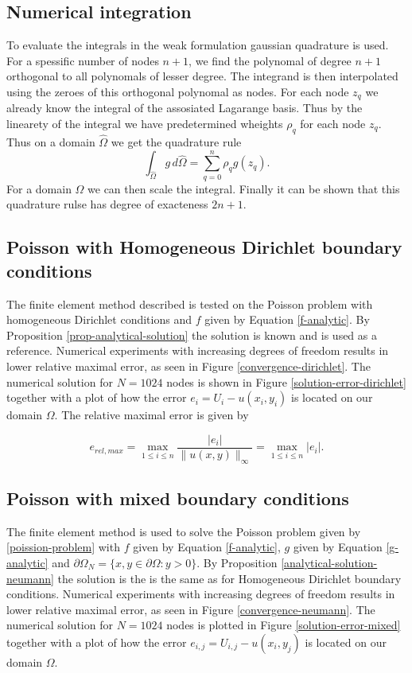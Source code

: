 \documentclass[a4paper,english]{elsarticle}%
\begin{document}
\subsection{Numerical integration}
To evaluate the integrals in the weak formulation gaussian quadrature is used. For a spessific number of nodes $n+1$, we find the polynomal of degree $n+1$ orthogonal to all polynomals of lesser degree. The integrand is then interpolated using the zeroes of this orthogonal polynomal as nodes. For each node $z_q$ we already know the integral of the assosiated Lagarange basis. Thus by the linearety of the integral we have predetermined wheights $\rho_q$  for each node $z_q$. Thus on a domain $\hat{\Omega}$ we get the quadrature rule
\begin{equation}
    \int_{\hat{\Omega}} g \, d\hat{\Omega} = \sum_{q=0}^{n}{\rho_q g(z_q)}.
\end{equation}
For a domain $\Omega$ we can then scale the integral. Finally it can be shown that this quadrature rulse has degree of exacteness $2n+1$.


\subsection{Poisson with Homogeneous Dirichlet boundary conditions}
The finite element method described is tested on the Poisson problem with homogeneous Dirichlet conditions and $f$ given by Equation \eqref{f-analytic}. 
By Proposition \ref{prop-analytical-solution} the solution is known and is used as a reference. 
Numerical experiments with increasing degrees of freedom results in lower relative maximal error, as seen in Figure \ref{convergence-dirichlet}. The numerical solution for $N = 1024$ nodes is shown in Figure \ref{solution-error-dirichlet}
together with a plot of how the error $e_{i} = U_{i} - u(x_i,y_i)$ is located on our domain $\Omega$. 
The relative maximal error is given by

\begin{equation*}
    e_{rel,max} = \max_{1\leq i \leq n} \frac{|e_i|}{\| u(x,y)\|_{\infty}} = \max_{1\leq i \leq n} |e_i|.
\end{equation*}

\subsection{Poisson with mixed boundary conditions}
The finite element method is used to solve the Poisson problem given by \eqref{poission-problem} with $f$ given by Equation \eqref{f-analytic}, $g$ given by Equation \eqref{g-analytic} and $\partial \Omega_N = \{ x,y \in \partial \Omega : y> 0\}$. By Proposition \ref{analytical-solution-neumann} the solution is the is the same as for Homogeneous Dirichlet boundary conditions. Numerical experiments with increasing degrees of freedom results in lower relative maximal error, as seen in Figure \ref{convergence-neumann}. The numerical solution for $N = 1024$ nodes is plotted in Figure \ref{solution-error-mixed} together with a plot of how the error $e_{i,j} = U_{i,j} - u(x_i,y_j)$ is located on our domain $\Omega$. 
\end{document}
